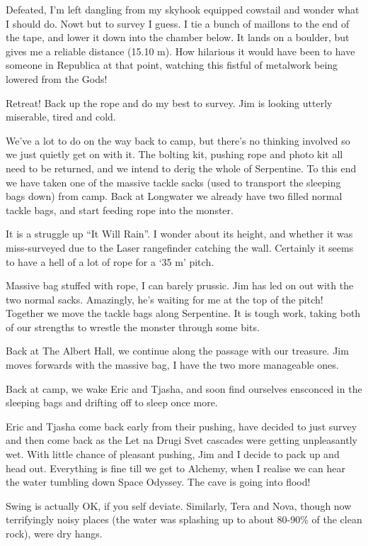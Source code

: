 Defeated, I'm left dangling from my skyhook equipped cowstail and wonder
what I should do. Nowt but to survey I guess. I tie a bunch of maillons
to the end of the tape, and lower it down into the chamber below. It
lands on a boulder, but gives me a reliable distance (15.10 m). How
hilarious it would have been to have someone in Republica at that point,
watching this fistful of metalwork being lowered from the Gods!

Retreat! Back up the rope and do my best to survey. Jim is looking
utterly miserable, tired and cold.

We've a lot to do on the way back to camp, but there's no thinking
involved so we just quietly get on with it. The bolting kit, pushing
rope and photo kit all need to be returned, and we intend to derig the
whole of Serpentine. To this end we have taken one of the massive tackle
sacks (used to transport the sleeping bags down) from camp. Back at
Longwater we already have two filled normal tackle bags, and start
feeding rope into the monster.

It is a struggle up ``It Will Rain''. I wonder about its height, and
whether it was miss-surveyed due to the Laser rangefinder catching the
wall. Certainly it seems to have a hell of a lot of rope for a `35 m'
pitch.

Massive bag stuffed with rope, I can barely prussic. Jim has led on out
with the two normal sacks. Amazingly, he's waiting for me at the top of
the pitch! Together we move the tackle bags along Serpentine. It is
tough work, taking both of our strengths to wrestle the monster through
some bits.

Back at The Albert Hall, we continue along the passage with our
treasure. Jim moves forwards with the massive bag, I have the two more
manageable ones.

Back at camp, we wake Eric and Tjasha, and soon find ourselves ensconced
in the sleeping bags and drifting off to sleep once more.

Eric and Tjasha come back early from their pushing, have decided to just
survey and then come back as the Let na Drugi Svet cascades were getting
unpleasantly wet. With little chance of pleasant pushing, Jim and I
decide to pack up and head out. Everything is fine till we get to
Alchemy, when I realise we can hear the water tumbling down Space
Odyssey. The cave is going into flood!

Swing is actually OK, if you self deviate. Similarly, Tera and Nova,
though now terrifyingly noisy places (the water was splashing up to
about 80-90\% of the clean rock), were dry hangs.

